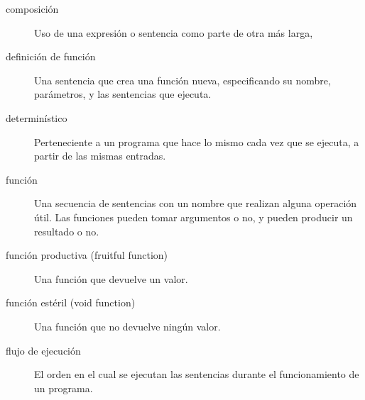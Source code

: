 
\begin{description}
\item[composición]
Uso de una expresión o sentencia como parte de otra más larga,
\end{description}


\begin{description}
\item[definición de función]
Una sentencia que crea una función nueva, especificando su nombre,
parámetros, y las sentencias que ejecuta.
\end{description}


\begin{description}
\item[determinístico]
Perteneciente a un programa que hace lo mismo cada vez que se ejecuta, a
partir de las mismas entradas.
\end{description}


\begin{description}
\item[función]
Una secuencia de sentencias con un nombre que realizan alguna operación
útil. Las funciones pueden tomar argumentos o no, y pueden producir un
resultado o no.
\end{description}


\begin{description}
\item[función productiva (fruitful function)]
Una función que devuelve un valor.
\end{description}


\begin{description}
\item[función estéril (void function)]
Una función que no devuelve ningún valor.
\end{description}


\begin{description}
\item[flujo de ejecución]
El orden en el cual se ejecutan las sentencias durante el funcionamiento
de un programa.
\end{description}

